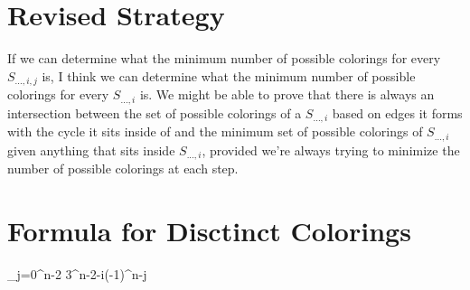 \documentclass[11pt,a4paper]{report}
\theoremstyle{plain}
\theoremstyle{definition}
\begin{document}
\section{Revised Strategy}

If we can determine what the minimum number of possible colorings for every $S_{..., i, j}$ is, I think we can determine what the minimum number of possible colorings for every $S_{..., i}$ is. We might be able to prove that there is always an intersection between the set of possible colorings of a $S_{..., i}$ based on edges it forms with the cycle it sits inside of and the minimum set of possible colorings of $S_{..., i}$ given anything that sits inside $S_{..., i}$, provided we're always trying to minimize the number of possible colorings at each step.

\section{Formula for Disctinct Colorings}

\displaystyle\sum_{j=0}^{n-2} 3^{n-2-i}(-1)^{n-j}
\end{document}
